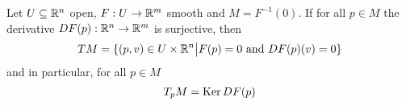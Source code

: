 \begin{bprop}[]
  Let $U \subseteq \mathbb{R}^{n}$ open, $F: U \to  \mathbb{R}^{m}$ smooth and $M = F^{-1}(0)$.
  If for all $p \in M$ the derivative $DF(p): \mathbb{R}^{n} \to  \mathbb{R}^{m}$ is surjective,
  then
  \begin{align*}
    TM = \{(p,v) \in U \times \mathbb{R}^{n} \big\vert F(p) = 0 \text{ and } DF(p)(v) = 0\}
  \end{align*}
  and in particular, for all $p \in M$ 
  \begin{align*}
    T_p M = \operatorname{Ker} DF(p)
  \end{align*}
\end{bprop}
